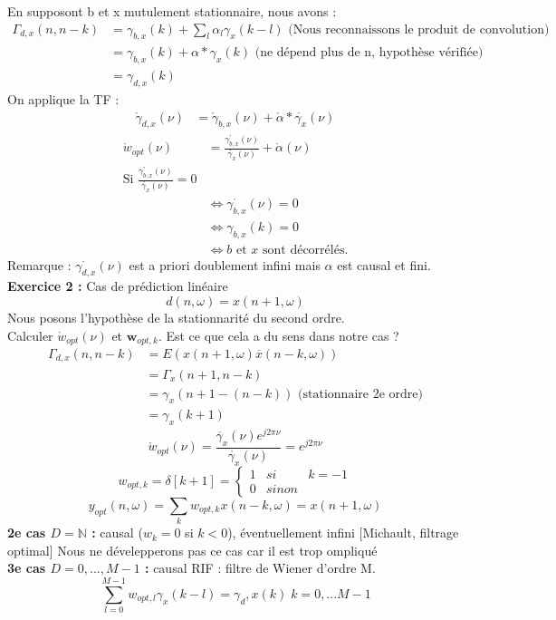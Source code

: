 \documentclass[12pt]{article}
\begin{document}
En supposont b et x mutulement stationnaire, nous avons :
\begin{align}
    \Gamma_{d,x}(n,n-k) &= \gamma_{b,x}(k) + \sum_l \alpha_l \gamma_x(k-l) \text{ (Nous reconnaissons le produit de convolution)} \nonumber \\
    &= \gamma_{b,x}(k) + \alpha * \gamma_x(k) \text{ (ne dépend plus de n, hypothèse vérifiée)} \nonumber \\
    &= \gamma_{d,x}(k) \nonumber 
\end{align}
On applique la TF : \\
\begin{align}
    \mathring{\gamma}_{d,x}(\nu) \nonumber &= \mathring{\gamma}_{b,x}(\nu) + \mathring{\alpha} * \mathring{\gamma_x}(\nu) \nonumber 
\end{align}
\begin{align}
    \mathring{w}_{opt} (\nu) &= \frac{\mathring{\gamma_{b,x}}(\nu)}{\mathring{\gamma_x}(\nu)} + \mathring{\alpha}(\nu) \nonumber \\
    \text{Si } \frac{\mathring{\gamma_{b,x}}(\nu)}{\mathring{\gamma_x}(\nu)} = 0 \nonumber \\ &\Leftrightarrow \mathring{\gamma_{b,x}}(\nu) = 0 \nonumber \\
    &\Leftrightarrow \gamma_{b,x}(k) = 0  \nonumber \\
    &\Leftrightarrow b \text{ et } x \text{ sont décorrélés.}
\end{align}
Remarque : $\mathring{\gamma_{d,x}}(\nu)$ est a priori doublement infini mais $\alpha$ est causal et fini.\\

\textbf{Exercice 2 : } Cas de prédiction linéaire\\
$$d(n,\omega) = x(n+1,\omega)$$
Nous posons l'hypothèse de la stationnarité du second ordre.\\
Calculer $\mathring{w}_{opt} (\nu)$ et $\mathbf{w}_{opt,k}$. Est ce que cela a du sens dans notre cas ?
\begin{align}
    \Gamma_{d,x}(n,n-k) &= E(x(n+1,\omega)\overline{x}(n-k,\omega)) \nonumber \\
    &= \Gamma_x(n+1,n-k) \nonumber \\
    &= \gamma_x(n+1-(n-k)) \text{ (stationnaire 2e ordre)} \nonumber \\
    &= \gamma_x(k+1) \nonumber
\end{align}
$$\mathring{w}_{opt}(\nu) = \frac{\mathring{\gamma_x}(\nu)e^{j2\pi \nu}}{\mathring{\gamma_x}(\nu)}= e^{j2\pi \nu}$$
$$w_{opt,k} = \delta [k+1] = \left \{
\begin{array}{rcl}
1 & si & k=-1  \\
0 & sinon &
\end{array}
\right.$$
$$y_{opt}(n,\omega) = \sum_k w_{opt,k} x(n-k,\omega) = x(n+1,\omega)$$
\textbf{2e cas $D=\mathbb{N}$ :} causal ($w_k=0$ si $k < 0$), éventuellement infini [Michault, filtrage optimal]
Nous ne dévelepperons pas ce cas car il est trop ompliqué\\
\textbf{3e cas $D = {0, ..., M-1}$ :} causal RIF : filtre de Wiener d'ordre M.
$$\sum_{l=0}^{M-1} w_{opt,l} \gamma_x(k-l)=\gamma_d,x(k) \; k=0,...M-1 $$
\end{document}
